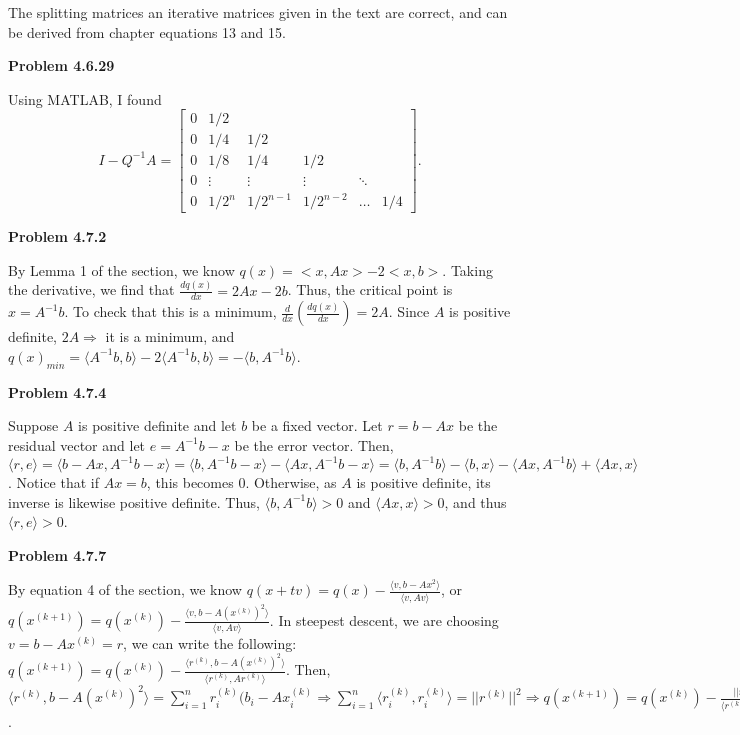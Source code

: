 \documentclass{article}
\newcommand{\Problem}[1]{\textbf{Problem #1}}
\begin{document}
The splitting matrices an iterative matrices given in the text are correct, and can be derived from chapter equations 13 and 15. 


\Problem{4.6.29}

Using MATLAB, I found 
\begin{equation*}
I - Q^{-1}A = 
\begin{bmatrix}
 0 & 1/2 & & & & \\
 0 & 1/4 & 1/2 & & &\\
 0 & 1/8 & 1/4 & 1/2 & & \\
 0 & \vdots & \vdots & \vdots & \ddots &\\
 0 & 1/2^n & 1/2^{n-1} & 1/2^{n-2} & \hdots & 1/4	
\end{bmatrix}.
\end{equation*}

\Problem{4.7.2}

By Lemma 1 of the section, we know $q(x) = <x, Ax> - 2<x,b>$. Taking the derivative, we find that $\frac{dq(x)}{dx}  = 2Ax - 2b$. Thus, the critical point is $x = A^{-1}b$. To check that this is a minimum, $\frac{d}{dx}\left(\frac{dq(x)}{dx}\right) = 2A$. Since $A$ is positive definite, $2A \Rightarrow $ it is a minimum, and $q(x)_{min} = \langle A^{-1}b,b \rangle - 2\langle A^{-1}b,b\rangle = -\langle b,A^{-1}b\rangle$. 


\Problem{4.7.4}

Suppose $A$ is positive definite and let $b$ be a fixed vector. Let $r = b-Ax$ be the residual vector and let $e = A^{-1}b - x$ be the error vector. Then, $\langle r,e \rangle = \langle b - Ax, A^{-1}b - x \rangle = \langle b, A^{-1}b - x \rangle - \langle Ax, A^{-1}b - x \rangle = \langle b, A^{-1}b \rangle - \langle b, x \rangle - \langle Ax, A^{-1}b \rangle + \langle Ax, x \rangle$. Notice that if $Ax = b$, this becomes $0$. Otherwise, as $A$ is positive definite, its inverse is likewise positive definite. Thus, $\langle b, A^{-1}b \rangle > 0$ and $\langle Ax, x \rangle > 0$, and thus $\langle r, e \rangle > 0$. 

\Problem{4.7.7}

By equation 4 of the section, we know $q(x + tv) = q(x) - \frac{\langle v, b-Ax^2 \rangle}{\langle v, Av \rangle}$, or $q(x^{(k+1)}) = q(x^{(k)}) - \frac{\langle v, b-A(x^{(k)})^2 \rangle}{\langle v, Av \rangle}$. In steepest descent, we are choosing $v = b - Ax^{(k)} = r$, we can write the following: $q(x^{(k+1)}) = q(x^{(k)}) - \frac{\langle r^{(k)}, b-A(x^{(k)})^2 \rangle}{\langle r^{(k)}, Ar^{(k)} \rangle}$. Then, $\langle r^{(k)}, b-A(x^{(k)})^2 \rangle = \displaystyle\sum_{i=1}^n r_i^{(k)}(b_i - Ax_i^{(k)} \Rightarrow \displaystyle\sum_{i=1}^n \langle r_i^{(k)}, r_i^{(k)} \rangle = ||r^{(k)}||^2 \Rightarrow q(x^{(k+1)}) = q(x^{(k)}) - \frac{||r^{(k)}||^2}{\langle r^{(k)}, Ar^{(k)} \rangle}$.  
\end{document}
